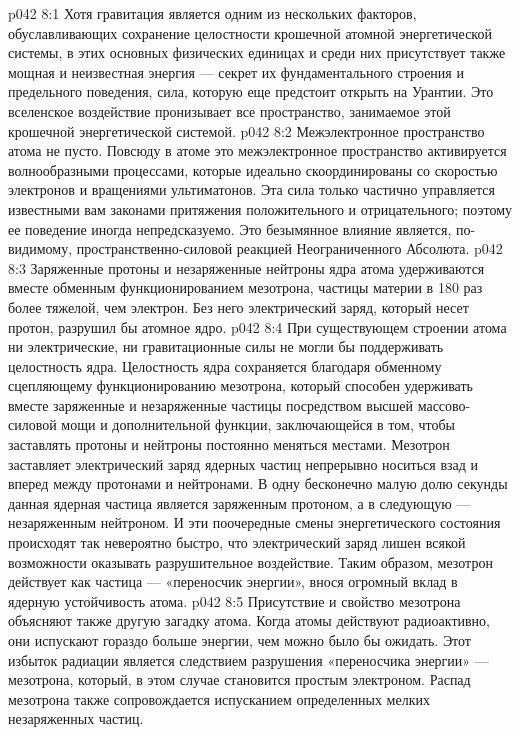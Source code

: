 \vs p042 8:1 Хотя гравитация является одним из нескольких факторов, обуславливающих сохранение целостности крошечной атомной энергетической системы, в этих основных физических единицах и среди них присутствует также мощная и неизвестная энергия --- секрет их фундаментального строения и предельного поведения, сила, которую еще предстоит открыть на Урантии. Это вселенское воздействие пронизывает все пространство, занимаемое этой крошечной энергетической системой.
\vs p042 8:2 Межэлектронное пространство атома не пусто. Повсюду в атоме это межэлектронное пространство активируется волнообразными процессами, которые идеально скоординированы со скоростью электронов и вращениями ультиматонов. Эта сила только частично управляется известными вам законами притяжения положительного и отрицательного; поэтому ее поведение иногда непредсказуемо. Это безымянное влияние является, по\hyp{}видимому, пространственно\hyp{}силовой реакцией Неограниченного Абсолюта.
\vs p042 8:3 \pc Заряженные протоны и незаряженные нейтроны ядра атома удерживаются вместе обменным функционированием мезотрона, частицы материи в 180 раз более тяжелой, чем электрон. Без него электрический заряд, который несет протон, разрушил бы атомное ядро.
\vs p042 8:4 При существующем строении атома ни электрические, ни гравитационные силы не могли бы поддерживать целостность ядра. Целостность ядра сохраняется благодаря обменному сцепляющему функционированию мезотрона, который способен удерживать вместе заряженные и незаряженные частицы посредством высшей массово\hyp{}силовой мощи и дополнительной функции, заключающейся в том, чтобы заставлять протоны и нейтроны постоянно меняться местами. Мезотрон заставляет электрический заряд ядерных частиц непрерывно носиться взад и вперед между протонами и нейтронами. В одну бесконечно малую долю секунды данная ядерная частица является заряженным протоном, а в следующую --- незаряженным нейтроном. И эти поочередные смены энергетического состояния происходят так невероятно быстро, что электрический заряд лишен всякой возможности оказывать разрушительное воздействие. Таким образом, мезотрон действует как частица --- «переносчик энергии», внося огромный вклад в ядерную устойчивость атома.
\vs p042 8:5 Присутствие и свойство мезотрона объясняют также другую загадку атома. Когда атомы действуют радиоактивно, они испускают гораздо больше энергии, чем можно было бы ожидать. Этот избыток радиации является следствием разрушения «переносчика энергии» --- мезотрона, который, в этом случае становится простым электроном. Распад мезотрона также сопровождается испусканием определенных мелких незаряженных частиц.
